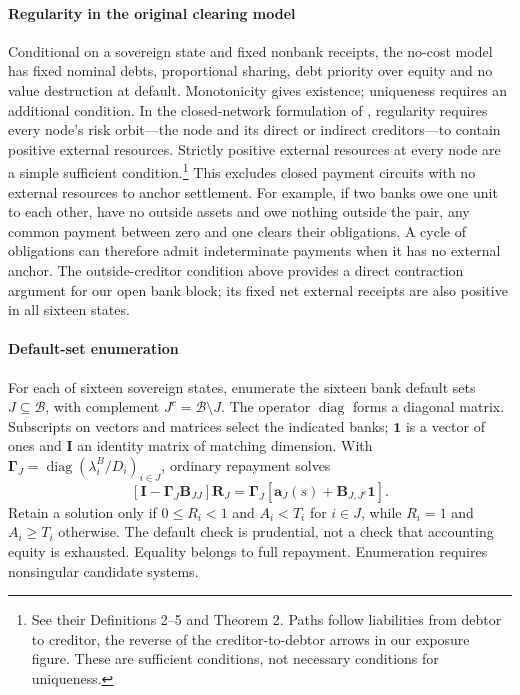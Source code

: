 \paragraph{Regularity in the original clearing model}
Conditional on a sovereign state and fixed nonbank receipts, the no-cost model has fixed nominal debts, proportional sharing, debt priority over equity and no value destruction at default. Monotonicity gives existence; uniqueness requires an additional condition. In the closed-network formulation of \citet{EisenbergNoe2001}, regularity requires every node's risk orbit---the node and its direct or indirect creditors---to contain positive external resources. Strictly positive external resources at every node are a simple sufficient condition.\footnote{See their Definitions 2--5 and Theorem 2. Paths follow liabilities from debtor to creditor, the reverse of the creditor-to-debtor arrows in our exposure figure. These are sufficient conditions, not necessary conditions for uniqueness.} This excludes closed payment circuits with no external resources to anchor settlement. For example, if two banks owe one unit to each other, have no outside assets and owe nothing outside the pair, any common payment between zero and one clears their obligations. A cycle of obligations can therefore admit indeterminate payments when it has no external anchor. The outside-creditor condition above provides a direct contraction argument for our open bank block; its fixed net external receipts are also positive in all sixteen states.

\paragraph{Default-set enumeration}

For each of sixteen sovereign states, enumerate the sixteen bank default sets $J\subseteq\mathcal B$, with complement $J^c=\mathcal B\setminus J$. The operator $\operatorname{diag}$ forms a diagonal matrix. Subscripts on vectors and matrices select the indicated banks; $\mathbf1$ is a vector of ones and $\mathbf{I}$ an identity matrix of matching dimension. With $\boldsymbol{\Gamma}_J=\operatorname{diag}(\lambda_i^B/D_i)_{i\in J}$, ordinary repayment solves
\[
 [\mathbf{I}-\boldsymbol{\Gamma}_J\mathbf{B}_{JJ}]\mathbf{R}_J
   =\boldsymbol{\Gamma}_J[\mathbf{a}_J(s)+\mathbf{B}_{J,J^c}\mathbf1].
\]
Retain a solution only if $0\leq R_i<1$ and $A_i<T_i$ for $i\in J$, while $R_i=1$ and $A_i\geq T_i$ otherwise. The default check is prudential, not a check that accounting equity is exhausted. Equality belongs to full repayment. Enumeration requires nonsingular candidate systems.


